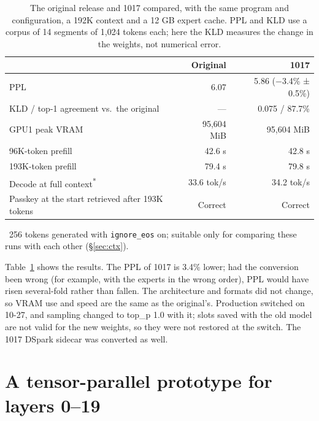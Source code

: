 \documentclass[11pt,a4paper]{article}
\newcommand{\code}[1]{\texttt{#1}}
\newcommand{\tps}{tok/s}
\begin{document}
\begin{table}[h]
  \centering
  \small
  \caption{The original release and 1017 compared, with the same program and configuration, a 192K context and a 12 GB expert cache. PPL and KLD use a corpus of 14 segments of 1,024 tokens each; here the KLD measures the change in the weights, not numerical error.}
  \label{tab:w1017}
  \begin{tabular}{@{}l r r@{}}
    \toprule
     & Original & 1017 \\
    \midrule
    PPL & 6.07 & 5.86 ($-$3.4\% ± 0.5\%) \\
    KLD / top-1 agreement vs.\ the original & --- & 0.075 / 87.7\% \\
    GPU1 peak VRAM & 95,604 MiB & 95,604 MiB \\
    96K-token prefill & 42.6 s & 42.8 s \\
    193K-token prefill & 79.4 s & 79.8 s \\
    Decode at full context\textsuperscript{*} & 33.6 \tps{} & 34.2 \tps{} \\
    Passkey at the start retrieved after 193K tokens & Correct & Correct \\
    \bottomrule
  \end{tabular}
  \par\smallskip\footnotesize *\ 256 tokens generated with \code{ignore\_eos} on; suitable only for comparing these runs with each other (\S\ref{sec:ctx}).
\end{table}

Table~\ref{tab:w1017} shows the results. The PPL of 1017 is 3.4\% lower; had the conversion been wrong (for example, with the experts in the wrong order), PPL would have risen several-fold rather than fallen. The architecture and formats did not change, so VRAM use and speed are the same as the original's. Production switched on 10-27, and sampling changed to top\_p 1.0 with it; slots saved with the old model are not valid for the new weights, so they were not restored at the switch. The 1017 DSpark sidecar was converted as well.

\section{A tensor-parallel prototype for layers 0--19}
\label{sec:tp}
\end{document}
